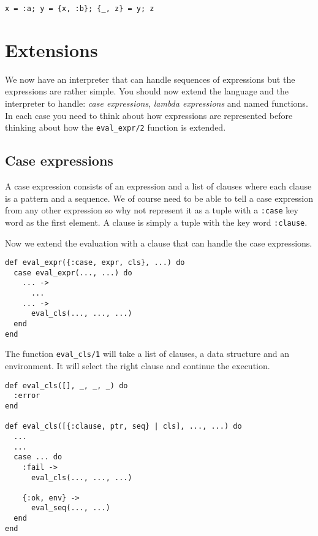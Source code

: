 \documentclass[a4paper,11pt]{article}
\begin{document}
\begin{verbatim}
x = :a; y = {x, :b}; {_, z} = y; z
\end{verbatim}



\section{Extensions}

We now have an interpreter that can handle sequences of expressions
but the expressions are rather simple. You should now extend the
language and the interpreter to handle: {\em case expressions}, {\em
  lambda expressions} and named functions. In each case you need to
think about how expressions are represented before thinking about how
the {\tt eval_expr/2} function is extended.

\subsection{Case expressions}
A case expression consists of an expression and a list of clauses
where each clause is a pattern and a sequence. We of course need to be
able to tell a case expression from any other expression so why not
represent it as a tuple with a {\tt :case} key word as the first
element. A clause is simply a tuple with the key word {\tt :clause}.

Now we extend the evaluation with a clause that can handle the case
expressions.

\begin{verbatim}
def eval_expr({:case, expr, cls}, ...) do
  case eval_expr(..., ...) do
    ... ->
      ...
    ... ->
      eval_cls(..., ..., ...)
  end
end
\end{verbatim}

The function {\tt eval_cls/1} will take a list of
clauses, a data structure and an environment. It will select the right
clause and continue the execution.

\begin{verbatim}
def eval_cls([], _, _, _) do
  :error
end

def eval_cls([{:clause, ptr, seq} | cls], ..., ...) do
  ...
  ...
  case ... do
    :fail ->
      eval_cls(..., ..., ...)

    {:ok, env} ->
      eval_seq(..., ...)
  end
end
\end{verbatim}
\end{document}
